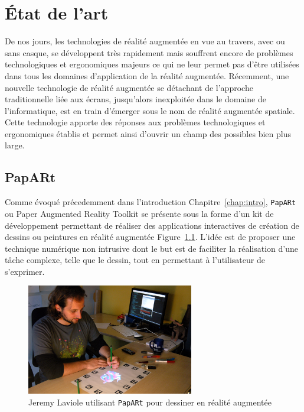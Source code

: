 \chapter{État de l'art}

De nos jours, les technologies de réalité augmentée en vue au travers, avec ou sans casque, se développent très rapidement mais souffrent encore de problèmes technologiques et ergonomiques majeurs ce qui ne leur permet pas d'être utilisées dans tous les domaines d'application de la réalité augmentée\cite{li2017state}. 
Récemment, une nouvelle technologie de réalité augmentée se détachant de l'approche traditionnelle liée aux écrans, jusqu'alors inexploitée dans le domaine de l'informatique, est en train d'émerger sous le nom de réalité augmentée spatiale. Cette technologie apporte des réponses aux problèmes technologiques et ergonomiques établis et permet ainsi d'ouvrir un champ des possibles bien plus large\cite{bimber2006modern}.

\section{PapARt}
\label{sec:papart}
Comme évoqué précedemment dans l'introduction Chapitre~\ref{chap:intro}, \texttt{PapARt} ou Paper Augmented Reality Toolkit se présente sous la forme d'un kit de développement permettant de réaliser des applications interactives de création de dessins ou peintures en réalité augmentée Figure~\ref{fig:papartdemo}. L'idée est de proposer une technique numérique non intrusive dont le but est de faciliter la réalisation d'une tâche complexe, telle que le dessin, tout en permettant à l'utilisateur de s'exprimer\cite{laviole2012papart}.
\begin{figure}[H]
\centering
\includegraphics[width=0.65\textwidth]{images/papart-demo}
\caption{Jeremy Laviole utilisant \texttt{PapARt} pour dessiner en réalité augmentée\protect\footnotemark}
\label{fig:papartdemo}
\end{figure}

